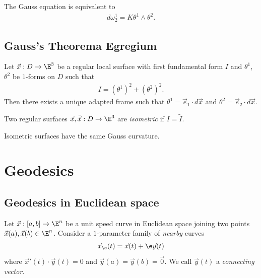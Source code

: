 \documentclass{article}
\begin{document}
\begin{proposition}
    The Gauss equation is equivalent to 
    \begin{align*}
        d\omega_2^1 = K\theta^1\wedge\theta^2.
    \end{align*}
\end{proposition}

\subsection{Gauss's Theorema Egregium}

\begin{proposition}
    Let $\vec x:D\to\E^3$ be a regular local surface with first fundamental form 
    $I$ and $\theta^1$, $\theta^2$ be $1$-forms on $D$ such that 
    \begin{align*}
        I = (\theta^1)^2+(\theta^2)^2.
    \end{align*}
    Then there exists a unique adapted frame such that $\theta^1=\vec e_1\cdot d\vec x$
    and $\theta^2 = \vec e_2 \cdot d\vec x$.
\end{proposition}

\begin{definition}
    Two regular surfaces $\vec x,\tilde{\vec x}:D\to\E^3$ are \emph{isometric}
    if $I=\tilde I$.
\end{definition}

\begin{theorem}
    Isometric surfaces have the same Gauss curvature.
\end{theorem}

\section{Geodesics}

\subsection{Geodesics in Euclidean space}

\begin{definition}
    Let $\vec x:[a,b]\to\E^n$ be a unit speed curve in Euclidean space joining two points 
    $\vec x(a),\vec x(b)\in\E^n$. Consider a $1$-parameter family of \emph{nearby} curves 
    \begin{align*}
        \vec x_\e (t) = \vec x(t) + \e\vec y(t)
    \end{align*}
    where $\vec x'(t) \cdot \vec y(t)  = 0$ and $\vec y(a)=\vec y(b)=\vec 0$.
    We call $\vec y(t)$ a \emph{connecting vector}.
\end{definition}
\end{document}
